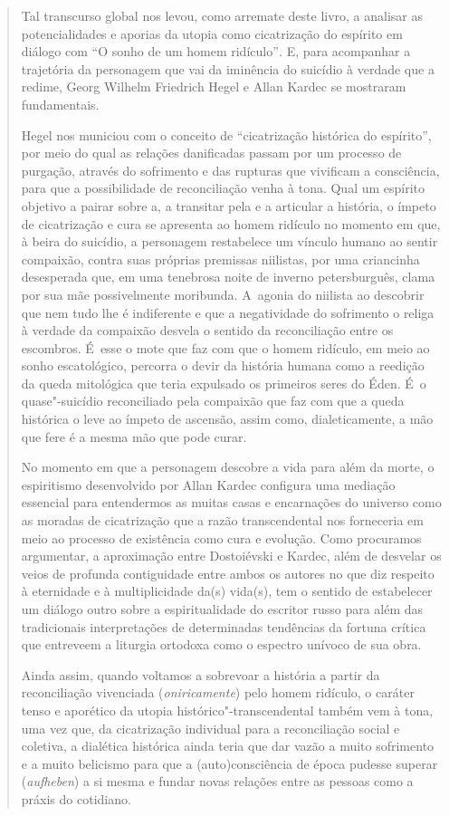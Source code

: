 {\begin{quote}
Tal transcurso global nos levou, como arremate deste livro, a analisar
as potencialidades e aporias da utopia como cicatrização do espírito em
diálogo com ``O sonho de um homem ridículo''\emph{.} E, para acompanhar
a trajetória da personagem que vai da iminência do suicídio à verdade
que a redime, Georg Wilhelm Friedrich Hegel e Allan Kardec se mostraram
fundamentais.

Hegel nos municiou com o conceito de ``cicatrização histórica do
espírito'', por meio do qual as relações danificadas passam por um
processo de purgação, através do sofrimento e das rupturas que vivificam
a consciência, para que a possibilidade de reconciliação venha à tona.
Qual um espírito objetivo a pairar sobre a, a transitar pela e a
articular a história, o ímpeto de cicatrização e cura se apresenta ao
homem ridículo no momento em que, à beira do suicídio, a personagem
restabelece um vínculo humano ao sentir compaixão, contra suas próprias
premissas niilistas, por uma criancinha desesperada que, em uma
tenebrosa noite de inverno petersburguês, clama por sua mãe
possivelmente moribunda. A~agonia do niilista ao descobrir que nem tudo
lhe é indiferente e que a negatividade do sofrimento o religa à verdade
da compaixão desvela o sentido da reconciliação entre os escombros. É~esse
o mote que faz com que o homem ridículo, em meio ao sonho
escatológico, percorra o devir da história humana como a reedição da
queda mitológica que teria expulsado os primeiros seres do Éden. É~o
quase"-suicídio reconciliado pela compaixão que faz com que a queda
histórica o leve ao ímpeto de ascensão, assim como, dialeticamente, a
mão que fere é a mesma mão que pode curar.

No momento em que a personagem descobre a vida para além da morte, o
espiritismo desenvolvido por Allan Kardec configura uma mediação
essencial para entendermos as muitas casas e encarnações do universo
como as moradas de cicatrização que a razão transcendental nos
forneceria em meio ao processo de existência como cura e evolução. Como
procuramos argumentar, a aproximação entre Dostoiévski e Kardec, além de
desvelar os veios de profunda contiguidade entre ambos os autores no que
diz respeito à eternidade e à multiplicidade da(s) vida(s), tem o
sentido de estabelecer um diálogo outro sobre a espiritualidade do
escritor russo para além das tradicionais interpretações de determinadas
tendências da fortuna crítica que entreveem a liturgia ortodoxa como o
espectro unívoco de sua obra.

Ainda assim, quando voltamos a sobrevoar a história a partir da
reconciliação vivenciada (\emph{oniricamente}) pelo homem ridículo, o
caráter tenso e aporético da utopia histórico"-transcendental também vem
à tona, uma vez que, da cicatrização individual para a reconciliação
social e coletiva, a dialética histórica ainda teria que dar vazão a
muito sofrimento e a muito belicismo para que a (auto)consciência de
época pudesse superar (\emph{aufheben}) a si mesma e fundar novas
relações entre as pessoas como a práxis do cotidiano.


\end{quote}}
